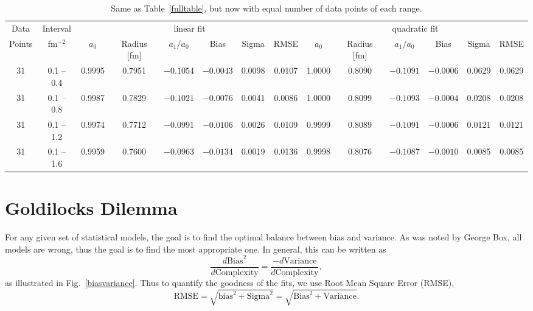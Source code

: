\documentclass[10pt,aps,prc,twocolumn]{revtex4-1}
\begin{document}
\begin{table}
\caption{Same as Table~\ref{fulltable}, but now with equal number of data points of each range.}
\begin{tabular}{cc|cccccc|cccccc} \hline
Data   & Interval  & \multicolumn{6}{c|}{linear fit}                       & \multicolumn{6}{c}{quadratic fit}                    \\ 
Points & fm$^{-2}$ &   $a_0$  & Radius [fm]&  $a_1/a_0$ &  Bias  & Sigma &  RMSE  &   $a_0$  & Radius [fm]& $a_1/a_0$  &  Bias  & Sigma &  RMSE \\  \hline
31& 0.1 -- 0.4 & 0.9995& 0.7951& $-0.1054$& $-0.0043$& 0.0098& 0.0107 & 1.0000& 0.8090& $-0.1091$& $-0.0006$& 0.0629& 0.0629 \\
31& 0.1 -- 0.8 & 0.9987& 0.7829& $-0.1021$& $-0.0076$& 0.0041& 0.0086 & 1.0000& 0.8099& $-0.1093$& $-0.0004$& 0.0208& 0.0208  \\
31& 0.1 -- 1.2 & 0.9974& 0.7712& $-0.0991$& $-0.0106$& 0.0026& 0.0109 & 0.9999& 0.8089& $-0.1091$& $-0.0006$& 0.0121& 0.0121  \\
31& 0.1 -- 1.6 & 0.9959& 0.7600& $-0.0963$& $-0.0134$& 0.0019& 0.0136 & 0.9998& 0.8076& $-0.1087$& $-0.0010$& 0.0085& 0.0085  \\  \hline
\end{tabular}
\label{equaldatatable}
\end{table}

\section{Goldilocks Dilemma}

For any given set of statistical models, the goal is to find the optimal balance between bias and variance.   
As was noted by George Box, all models are wrong, thus the goal is to find the most appropriate one. 
In general, this can be written as
\begin{equation}
\frac{d {\mathrm{Bias}^2 }}{ d {\mathrm{Complexity}}} = \frac{- d {\mathrm{Variance}} }{ d {\mathrm{Complexity}}},
\end{equation}
as illustrated in Fig.~\ref{biasvariance}.
Thus to quantify the goodness of the fits, we use Root Mean Square Error (RMSE),
\begin{equation}
{\mathrm{RMSE}} = \sqrt{ {\mathrm{bias}}^2 + {\mathrm{Sigma}}^2} = \sqrt{{\mathrm{Bias}}^2 + {\mathrm{Variance}}}.
\end{equation}
\end{document}
